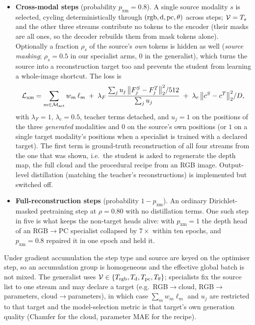 \begin{itemize}
\item \textbf{Cross-modal steps} (probability $p_{\mathrm{xm}}{=}0.8$). A single
  source modality $s$ is selected, cycling deterministically through
  $(\mathrm{rgb},\mathrm{d},\mathrm{pc},\theta)$ across steps; $\mathcal{V}=T_s$ and the other three streams
  contribute no tokens to the encoder (their masks are all ones, so the decoder
  rebuilds them from mask tokens alone). Optionally a fraction $\rho_s$ of the
  source's \emph{own} tokens is hidden as well (\emph{source masking};
  $\rho_s{=}0.5$ in our specialist arms, 0 in the generalist), which turns the
  source into a reconstruction target too and prevents the student from learning
  a whole-image shortcut. The loss is
  \begin{equation}
    \mathcal{L}_{\mathrm{xm}} = \sum_{m\in\mathcal{M}_{\mathrm{act}}} w_m\,\ell_m
      \;+\; \lambda_F\,\frac{\sum_{j} u_j\,\big\|F^{S}_j-F^{T}_j\big\|_2^2/512}{\sum_j u_j}
      \;+\; \lambda_c\,\big\|c^{S}-c^{T}\big\|_2^2/D ,
    \label{eq:distill}
  \end{equation}
  with $\lambda_F{=}1$, $\lambda_c{=}0.5$, teacher terms detached, and $u_j{=}1$ on
  the positions of the three \emph{generated} modalities and $0$ on the source's
  own positions (or $1$ on a single target modality's positions when a specialist
  is trained with a declared target). The first term is ground-truth
  reconstruction of all four streams from the one that was shown, i.e.\ the
  student is asked to regenerate the depth map, the full cloud and the
  procedural recipe from an RGB image. Output-level distillation
  (matching the teacher's reconstructions) is implemented but switched off.
\item \textbf{Full-reconstruction steps} (probability $1-p_{\mathrm{xm}}$). An
  ordinary Dirichlet-masked pretraining step at $\rho{=}0.80$ with no distillation
  terms. One such step in five is what keeps the non-target heads alive: with
  $p_{\mathrm{xm}}{=}1$ the depth head of an RGB$\to$PC specialist collapsed by
  $7\times$ within ten epochs, and $p_{\mathrm{xm}}{=}0.8$ repaired it in one epoch
  and held it.
\end{itemize}

Under gradient accumulation the step type and source are keyed on the optimiser
step, so an accumulation group is homogeneous and the effective global batch is
not mixed. The generalist uses $\mathcal{V}\in\{T_{\mathrm{rgb}},T_{\mathrm{d}},T_{\mathrm{pc}},T_\theta\}$; specialists
fix the source list to one stream and may declare a target (e.g.\ RGB$\to$cloud,
RGB$\to$parameters, cloud$\to$parameters), in which case $\sum_m w_m\ell_m$ and
$u_j$ are restricted to that target and the model-selection metric is that
target's own generation quality (Chamfer for the cloud, parameter MAE for the
recipe).

